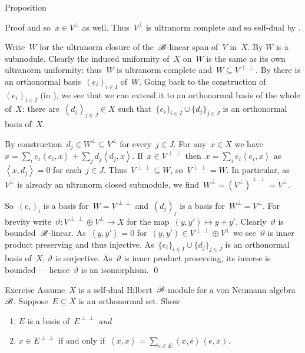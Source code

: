 \documentclass[b]{subfiles}
\begin{document}
\begin{parsec}
\begin{point}{Proposition}
\begin{point}{Proof}
    and so~$x \in V^\perp$ as well.
Thus~$V^\perp$ is ultranorm complete
    and so self-dual by .
\begin{point}%
Write~$W$ for the ultranorm closure of
    the~$\mathscr{B}$-linear span of~$V$ in~$X$.
By  $W$ is a submodule.
Clearly the induced uniformity of~$X$
    on~$W$ is the same as its own ultranorm uniformity:
    thus~$W$ is ultranorm complete
        and~$W \subseteq V^{\perp\perp}$.
By  there
    is an orthonormal basis~$(e_i)_{i \in I}$ of~$W$.
Going back to the construction of~$(e_i)_{i \in I}$
    (in ),
    we see that we can extend it to an orthonormal basis of the whole of~$X$:
    there are~$(d_j)_{j \in J} \in X$
    such that~$\{e_i\}_{i \in I} \cup \{d_j\}_{j \in J}$
    is an orthonormal basis of~$X$.
\end{point}
\begin{point}%
By construction~$d_j \in W^\perp \subseteq V^\perp$
    for every~$j \in J$.
For any~$x \in X$
    we have~$x = \sum_i e_i \left<e_i, x\right>
                + \sum_j d_j \left<d_j,x\right>$.
If~$x \in V^{\perp\perp}$
    then~$x = \sum_i e_i \left<e_i, x\right>$
    as~$\left<x, d_j\right>= 0$ for each~$j \in J$.
Thus~$V^{\perp\perp} \subseteq W$, so~$V^{\perp\perp} = W$.
In particular, as~$V^\perp$ is already an ultranorm closed submodule,
    we find~$W^\perp = (V^\perp)^{\perp\perp} = V^\perp$.
\end{point}
\begin{point}%
So~$(e_i)_i$ is a basis for~$W = V^{\perp\perp}$
    and~$(d_j)_j$ is a basis for~$W^\perp = V^\perp$.
For brevity write~$\vartheta\colon V^{\perp\perp} \oplus V^\perp \to X$
    for the map~$(y,y') \mapsto y+y'$.
Clearly~$\vartheta$ is bounded~$\mathscr{B}$-linear.
As~$\left<y,y'\right> = 0$ for~$(y,y') \in V^{\perp\perp} \oplus V^\perp$
    we see~$\vartheta$ is inner product preserving and thus injective.
As~$\{e_i\}_{i \in I} \cup \{d_j\}_{j \in J}$
    is an orthonormal basis of~$X$, $\vartheta$ is surjective.
As~$\vartheta$ is inner product preserving, its inverse is bounded
    --- hence~$\vartheta$ is an isomorphism.
    \qed
\end{point}
\end{point}
\end{point}
\begin{point}{Exercise}%
Assume~$X$ is a self-dual Hilbert~$\mathscr{B}$-module for a von Neumann
    algebra~$\mathscr{B}$.
Suppose~$E \subseteq X$ is an orthonormal set. Show
\begin{enumerate}
\item
    $E$ is a basis of~$E^{\perp\perp}$ \emph{and}
\item
    $x \in E^{\perp\perp}$
    if and only if~$\left<x,x\right> = \sum_{e \in E} \left<x,e\right>
                \left<e,x\right>$.
\end{enumerate}


\end{point}
\end{parsec}
\end{document}

